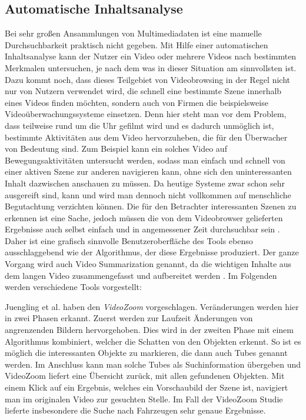 \documentclass[11pt,a4paper]{report}
\begin{document}
\subsection{Automatische Inhaltsanalyse}

Bei sehr großen Ansammlungen von Multimediadaten ist eine manuelle Durchsuchbarkeit praktisch nicht gegeben. Mit Hilfe einer automatischen Inhaltsanalyse kann der Nutzer ein Video oder mehrere Videos nach bestimmten Merkmalen untersuchen, je nach dem was in dieser Situation am sinnvollsten ist. Dazu kommt noch, dass dieses Teilgebiet von Videobrowsing in der Regel nicht nur von Nutzern verwendet wird, die schnell eine bestimmte Szene innerhalb eines Videos finden möchten, sondern auch von Firmen die beispielsweise Videoüberwachungssysteme einsetzen. Denn hier steht man vor dem Problem, dass teilweise rund um die Uhr gefilmt wird und es dadurch unmöglich ist, bestimmte Aktivitäten aus dem Video hervorzuheben, die für den Überwacher von Bedeutung sind. Zum Beispiel kann ein solches Video auf Bewegungsaktivitäten untersucht werden, sodass man einfach und schnell von einer aktiven Szene zur anderen navigieren kann, ohne sich den uninteressanten Inhalt dazwischen anschauen zu müssen. Da heutige Systeme zwar schon sehr ausgereift sind, kann und wird man dennoch nicht vollkommen auf menschliche Begutachtung verzichten können. Die für den Betrachter interessanten Szenen zu erkennen ist eine Sache, jedoch müssen die von dem Videobrowser gelieferten Ergebnisse auch selbst einfach und in angemessener Zeit durchsuchbar sein \cite{ghosh2012discovering}. Daher ist eine grafisch sinnvolle Benutzeroberfläche des Tools ebenso ausschlaggebend wie der Algorithmus, der diese Ergebnisse produziert. Der ganze Vorgang wird auch Video Summarization genannt, da die wichtigen Inhalte aus dem langen Video zusammengefasst und aufbereitet werden \cite{ngo2005video} \cite{vasconcelos1998bayesian}. Im Folgenden werden verschiedene Tools vorgestellt:

Juengling et al. \cite{juengling2014videozoom} haben den \emph{VideoZoom} vorgeschlagen. Veränderungen werden hier in zwei Phasen erkannt. Zuerst werden zur Laufzeit Änderungen von angrenzenden Bildern hervorgehoben. Dies wird in der zweiten Phase mit einem Algorithmus kombiniert, welcher die Schatten von den Objekten erkennt. So ist es möglich die interessanten Objekte zu markieren, die dann auch Tubes genannt werden. Im Anschluss kann man solche Tubes als Suchinformation übergeben und VideoZoom liefert eine Übersicht zurück, mit allen gefundenen Objekten. Mit einem Klick auf ein Ergebnis, welches ein Vorschaubild der Szene ist, navigiert man im originalen Video zur gesuchten Stelle. Im Fall der VideoZoom Studie lieferte insbesondere die Suche nach Fahrzeugen sehr genaue Ergebnisse.
\end{document}
